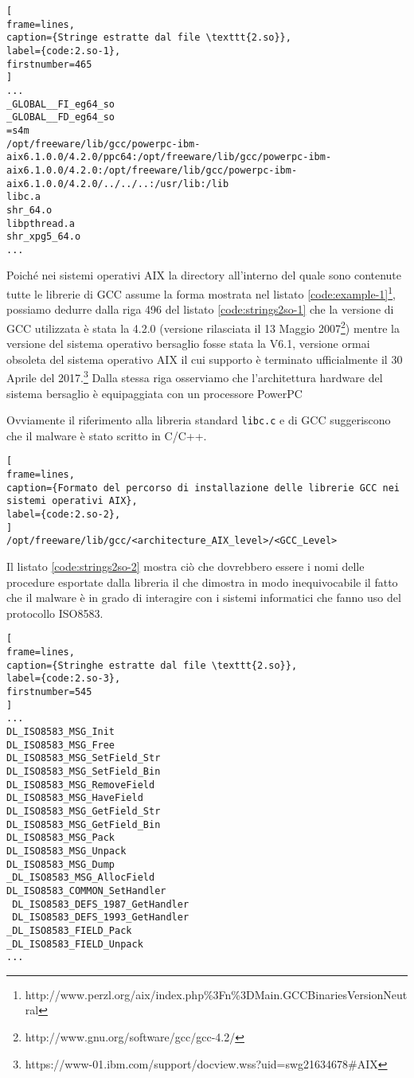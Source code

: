 \documentclass[10pt,a4paper, titlepage]{report}
\begin{document}
\begin{lstlisting}[
frame=lines, 
caption={Stringe estratte dal file \texttt{2.so}}, 
label={code:2.so-1},
firstnumber=465
]
...
_GLOBAL__FI_eg64_so
_GLOBAL__FD_eg64_so
=s4m
/opt/freeware/lib/gcc/powerpc-ibm-aix6.1.0.0/4.2.0/ppc64:/opt/freeware/lib/gcc/powerpc-ibm-aix6.1.0.0/4.2.0:/opt/freeware/lib/gcc/powerpc-ibm-aix6.1.0.0/4.2.0/../../..:/usr/lib:/lib
libc.a
shr_64.o
libpthread.a
shr_xpg5_64.o
...
\end{lstlisting}

Poiché nei sistemi operativi AIX la directory all'interno del quale sono contenute tutte le librerie di GCC assume la forma mostrata nel listato \ref{code:example-1}\footnote{http://www.perzl.org/aix/index.php\%3Fn\%3DMain.GCCBinariesVersionNeutral}, possiamo dedurre dalla riga 496 del listato \ref{code:strings2so-1} che la versione di GCC utilizzata è stata la 4.2.0 (versione rilasciata il 13 Maggio 2007\footnote{http://www.gnu.org/software/gcc/gcc-4.2/}) mentre la versione del sistema operativo bersaglio fosse stata la V6.1, versione ormai obsoleta del sistema operativo AIX il cui supporto è terminato ufficialmente il 30 Aprile del 2017.\footnote{https://www-01.ibm.com/support/docview.wss?uid=swg21634678\#AIX}
Dalla stessa riga osserviamo che l'architettura hardware del sistema bersaglio è equipaggiata con un processore PowerPC

Ovviamente il riferimento alla libreria standard \texttt{libc.c} e di GCC suggeriscono che il malware è stato scritto in C/C++.

\begin{lstlisting}[
frame=lines, 
caption={Formato del percorso di installazione delle librerie GCC nei sistemi operativi AIX}, 
label={code:2.so-2},
]
/opt/freeware/lib/gcc/<architecture_AIX_level>/<GCC_Level>
\end{lstlisting}

Il listato \ref{code:strings2so-2} mostra ciò che dovrebbero essere i nomi delle procedure esportate dalla libreria il che dimostra in modo inequivocabile il fatto che il malware è in grado di interagire con i sistemi informatici che fanno uso del protocollo ISO8583.

\begin{lstlisting}[
frame=lines, 
caption={Stringhe estratte dal file \texttt{2.so}}, 
label={code:2.so-3},
firstnumber=545
]
...
DL_ISO8583_MSG_Init
DL_ISO8583_MSG_Free
DL_ISO8583_MSG_SetField_Str
DL_ISO8583_MSG_SetField_Bin
DL_ISO8583_MSG_RemoveField
DL_ISO8583_MSG_HaveField
DL_ISO8583_MSG_GetField_Str
DL_ISO8583_MSG_GetField_Bin
DL_ISO8583_MSG_Pack
DL_ISO8583_MSG_Unpack
DL_ISO8583_MSG_Dump
_DL_ISO8583_MSG_AllocField
DL_ISO8583_COMMON_SetHandler
 DL_ISO8583_DEFS_1987_GetHandler
 DL_ISO8583_DEFS_1993_GetHandler
_DL_ISO8583_FIELD_Pack
_DL_ISO8583_FIELD_Unpack
...
\end{lstlisting}
\end{document}
